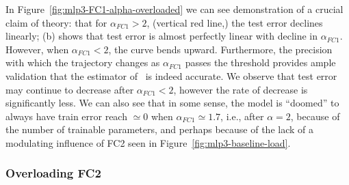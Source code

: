 In Figure~\ref{fig:mlp3-FC1-alpha-overloaded} we can see 
demonstration of a crucial claim of \SETOL theory: that for $\alpha_{FC1} > 2$, (vertical red line,) the test 
error declines linearly; (b) shows that test error is almost perfectly linear with decline in $\alpha_{FC1}$. However, when $\alpha_{FC1} < 2$, the curve bends 
upward. 
Furthermore, the precision with which the trajectory changes as $\alpha_{FC1}$ passes the threshold provides ample 
validation that the estimator of~\cite{CSN09_powerlaw} is indeed accurate. We 
observe that test error may continue to decrease after $\alpha_{FC1} < 2$, however the rate of decrease is significantly less. 
We can also see that in some sense, the model is ``doomed'' to always have train error reach $\simeq 0$ when 
$\alpha_{FC1} \simeq 1.7$, i.e., after $\alpha = 2$, because of the number of trainable parameters, and perhaps because 
of the lack of a modulating influence of FC2 seen in Figure~\ref{fig:mlp3-baseline-load}.




\subsubsection{Overloading FC2}
\label{sxn:hysteresis_effect_FC2}

